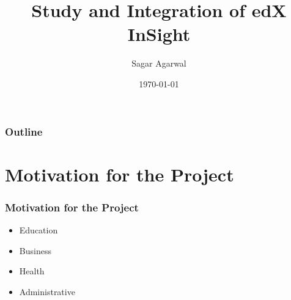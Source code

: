 \documentclass[12pt,xcolor=dvipsnames]{beamer}
\title{Study and Integration of edX InSight}
\author{Sagar Agarwal}
\date{\today}
\begin{document}
\begin{frame}
\titlepage
\end{frame}


\begin{frame}
\frametitle{Outline}
\begin{multicols}{2}
\tableofcontents[hideallsubsections]
\end{multicols}
\end{frame}

\section{Motivation for the  Project}
\begin{frame}[t]
\frametitle{Motivation for the  Project}

\begin{itemize}
 \item Education
 \item Business
 \item Health
 \item Administrative
\end{itemize}


\end{frame}

\end{document}

